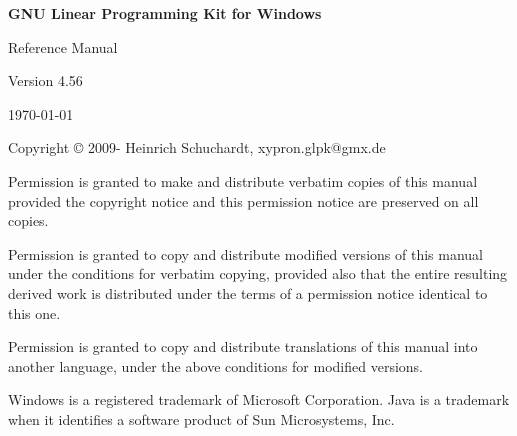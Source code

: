 \documentclass[a4paper,11pt]{report}
\newcommand{\glpkVersion}{4.56}
\begin{document}
\thispagestyle{empty}

\begin{center}

\vspace*{1in}

\begin{huge}
\sf\bfseries GNU Linear Programming Kit\linebreak
for Windows
\end{huge}

\vspace{0.5in}

\begin{LARGE}
\sf Reference Manual
\end{LARGE}

\vspace{0.5in}

\begin{LARGE}
\sf Version \glpkVersion
\end{LARGE}

\vspace{0.5in}
\begin{Large}
\sf \today
\end{Large}
\end{center}

\newpage

\vspace*{1in}

\vfill

\medskip \noindent
Copyright \copyright{} 2009-{\the\year} Heinrich Schuchardt, xypron.glpk@gmx.de

\medskip \noindent
Permission is granted to make and distribute verbatim copies of this
manual provided the copyright notice and this permission notice are
preserved on all copies.

\medskip \noindent
Permission is granted to copy and distribute modified versions of this
manual under the conditions for verbatim copying, provided also that the
entire resulting derived work is distributed under the terms of
a permission notice identical to this one.

\medskip \noindent
Permission is granted to copy and distribute translations of this manual
into another language, under the above conditions for modified versions.

\medskip \noindent
Windows is a registered trademark of Microsoft Corporation. Java is a 
trademark when it identifies a software product of Sun Microsystems, Inc.

\tableofcontents
\end{document}
